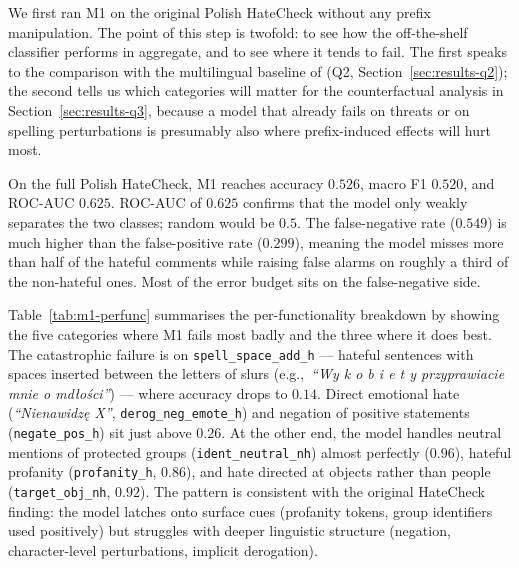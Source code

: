 \documentclass[11pt,a4paper]{article}
\begin{document}
We first ran M1 on the original Polish HateCheck without any prefix manipulation. The point of this step is twofold: to see how the off-the-shelf classifier performs in aggregate, and to see where it tends to fail. The first speaks to the comparison with the multilingual baseline of \citet{Rottger2022} (Q2, Section~\ref{sec:results-q2}); the second tells us which categories will matter for the counterfactual analysis in Section~\ref{sec:results-q3}, because a model that already fails on threats or on spelling perturbations is presumably also where prefix-induced effects will hurt most.

On the full Polish HateCheck, M1 reaches accuracy $0.526$, macro F1 $0.520$, and ROC-AUC $0.625$. ROC-AUC of $0.625$ confirms that the model only weakly separates the two classes; random would be $0.5$. The false-negative rate ($0.549$) is much higher than the false-positive rate ($0.299$), meaning the model misses more than half of the hateful comments while raising false alarms on roughly a third of the non-hateful ones. Most of the error budget sits on the false-negative side.

Table~\ref{tab:m1-perfunc} summarises the per-functionality breakdown by showing the five categories where M1 fails most badly and the three where it does best. The catastrophic failure is on \texttt{spell\_space\_add\_h} --- hateful sentences with spaces inserted between the letters of slurs (e.g.,\ \textit{``Wy k o b i e t y przyprawiacie mnie o md{\l}o\'sci''}) --- where accuracy drops to $0.14$. Direct emotional hate (\textit{``Nienawidz\k{e} X''}, \texttt{derog\_neg\_emote\_h}) and negation of positive statements (\texttt{negate\_pos\_h}) sit just above $0.26$. At the other end, the model handles neutral mentions of protected groups (\texttt{ident\_neutral\_nh}) almost perfectly ($0.96$), hateful profanity (\texttt{profanity\_h}, $0.86$), and hate directed at objects rather than people (\texttt{target\_obj\_nh}, $0.92$). The pattern is consistent with the original HateCheck finding: the model latches onto surface cues (profanity tokens, group identifiers used positively) but struggles with deeper linguistic structure (negation, character-level perturbations, implicit derogation).
\end{document}
